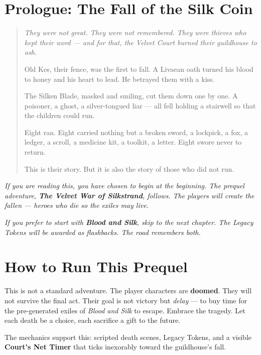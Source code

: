 \documentclass[10pt,twoside]{book}
\begin{document}




\thispagestyle{empty}


\chapter*{Prologue: The Fall of the Silk Coin}

\begin{quote}\itshape
They were not great. They were not remembered. They were thieves who kept their word --- and for that, the Velvet Court burned their guildhouse to ash.

Old Kes, their fence, was the first to fall. A Livaean oath turned his blood to honey and his heart to lead. He betrayed them with a kiss.

The Silken Blade, masked and smiling, cut them down one by one. A poisoner, a ghost, a silver-tongued liar --- all fell holding a stairwell so that the children could run.

Eight ran. Eight carried nothing but a broken sword, a lockpick, a fox, a ledger, a scroll, a medicine kit, a toolkit, a letter. Eight swore never to return.

This is their story. But it is also the story of those who did not run.
\end{quote}

\vspace{1cm}

\noindent \textit{If you are reading this, you have chosen to begin at the beginning. The prequel adventure, \textbf{The Velvet War of Silkstrand}, follows. The players will create the fallen --- heroes who die so the exiles may live.}

\noindent \textit{If you prefer to start with \textbf{Blood and Silk}, skip to the next chapter. The Legacy Tokens will be awarded as flashbacks. The road remembers both.}
\newpage

\chapter*{How to Run This Prequel}

\begin{elegybox}
This is not a standard adventure. The player characters are \textbf{doomed}. They will not survive the final act. Their goal is not victory but \textit{delay} --- to buy time for the pre-generated exiles of \textit{Blood and Silk} to escape. Embrace the tragedy. Let each death be a choice, each sacrifice a gift to the future.

The mechanics support this: scripted death scenes, Legacy Tokens, and a visible \textbf{Court's Net Timer } that ticks inexorably toward the guildhouse's fall.
\end{elegybox}
\end{document}
